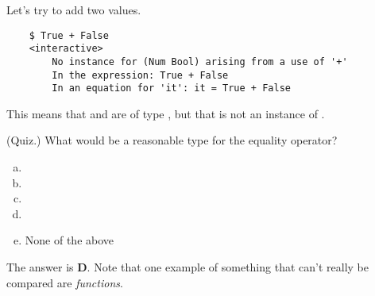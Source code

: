 \documentclass[letterpaper]{article}
\begin{document}
\bigskip 

Let's try to add two  values.
\begin{verbatim}
    $ True + False 
    <interactive>
        No instance for (Num Bool) arising from a use of '+'
        In the expression: True + False
        In an equation for 'it': it = True + False\end{verbatim}
This means that  and  are of type , but that  is not an instance of .

\begin{mdframed}[]
    (Quiz.) What would be a reasonable type for the equality operator? 
    \begin{enumerate}[(a)]
        \item {}
        \item {}
        \item {}
        \item {}
        \item None of the above 
    \end{enumerate}

    \begin{mdframed}[]
        The answer is \textbf{D}. Note that one example of something that can't really be compared are \emph{functions}.
    \end{mdframed}
\end{mdframed}
\end{document}
